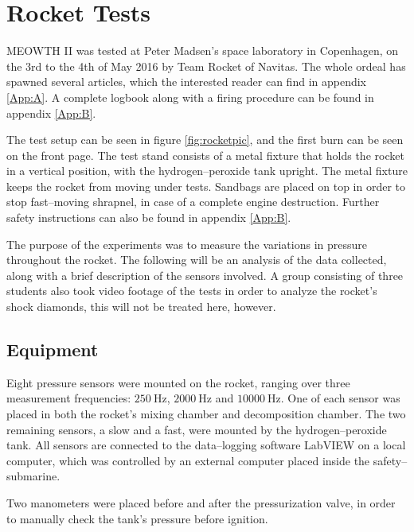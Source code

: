 \chapter{Rocket Tests}

	MEOWTH II was tested at Peter Madsen's space laboratory in Copenhagen, on the 3rd to the 4th of May 2016 by Team Rocket of Navitas. The whole ordeal has spawned several articles, which the interested reader can find in appendix \ref{App:A}. A  complete logbook along with a firing procedure can be found in appendix \ref{App:B}.

	The test setup can be seen in figure \ref{fig:rocketpic}, and the first burn can be seen on the front page. The test stand consists of a metal fixture that holds the rocket in a vertical position, with the hydrogen--peroxide tank upright. The metal fixture keeps the rocket from moving under tests. Sandbags are placed on top in order to stop fast--moving shrapnel, in case of a complete engine destruction. Further safety instructions can also be found in appendix \ref{App:B}.

	The purpose of the experiments was to measure the variations in pressure throughout the rocket. The following will be an analysis of the data collected, along with a brief description of the sensors involved. A group consisting of three students also took video footage of the tests in order to analyze the rocket's shock diamonds, this will not be treated here, however.

	\section{Equipment}

	Eight pressure sensors were mounted on the rocket, ranging over three measurement frequencies: $\SI{250}{\Hz}$, $\SI{2000}{\Hz}$ and $\SI{10000}{\Hz}$.  One of each sensor was placed in both the rocket's mixing chamber and decomposition chamber. The two remaining sensors, a slow and a fast, were mounted by the hydrogen--peroxide tank. All sensors are connected to the data--logging software LabVIEW on a local computer, which was controlled by an external computer placed inside the safety--submarine.

	Two manometers were placed before and after the pressurization valve, in order to manually check the tank's pressure before ignition.


%

